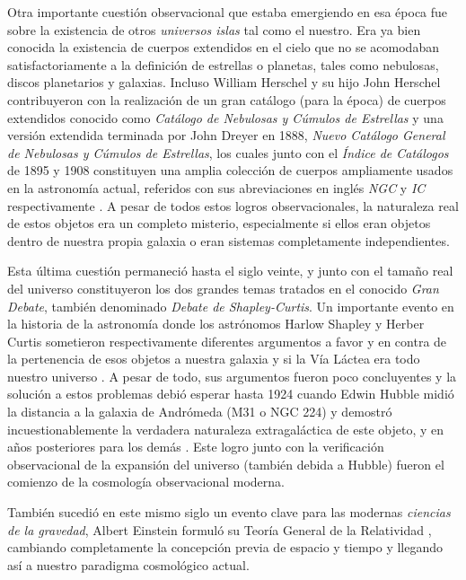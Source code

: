 Otra importante cuestión observacional que estaba emergiendo en esa época
fue sobre la existencia de otros \textit{universos islas} tal como el nuestro.
Era ya bien conocida la existencia de cuerpos extendidos en el cielo que no
se acomodaban satisfactoriamente a la definición de estrellas o planetas,
tales como nebulosas, discos planetarios y galaxias. Incluso William Herschel
y su hijo John Herschel contribuyeron con la realización de un gran catálogo
(para la época) de cuerpos extendidos conocido como \textit{Catálogo de 
Nebulosas y Cúmulos de Estrellas} y una versión extendida terminada por
John Dreyer en 1888, \textit{Nuevo Catálogo General de Nebulosas y Cúmulos
de Estrellas}, los cuales junto con el \textit{Índice de Catálogos} de 
1895 y 1908 constituyen una amplia colección de cuerpos ampliamente usados
en la astronomía actual, referidos con sus abreviaciones en inglés \textit{NGC}
y \textit{IC} respectivamente \cite{longair2008}. A pesar de todos estos
logros observacionales, la naturaleza real de estos objetos era un completo 
misterio, especialmente si ellos eran objetos dentro de nuestra propia 
galaxia o eran sistemas completamente independientes.


Esta última cuestión permaneció hasta el siglo veinte, y junto con el tamaño
real del universo constituyeron los dos grandes temas tratados en el 
conocido \textit{Gran Debate}, también denominado \textit{Debate de 
Shapley-Curtis}. Un importante evento en la historia de la astronomía donde
los astrónomos Harlow Shapley y Herber Curtis sometieron respectivamente 
diferentes argumentos a favor y en contra de la pertenencia de esos objetos
a nuestra galaxia y si la Vía Láctea era todo nuestro universo 
\cite{Curtis1921} \cite{Shapley1921}. A pesar de todo, sus argumentos fueron 
poco concluyentes y la solución a estos problemas debió esperar hasta 1924 
cuando Edwin Hubble midió la distancia a la galaxia de Andrómeda (M31 o 
NGC 224) y demostró incuestionablemente la verdadera naturaleza extragaláctica 
de este objeto, y en años posteriores para los demás \cite{Hubble1926}. 
Este logro junto con la verificación observacional de la expansión del 
universo (también debida a Hubble) fueron el comienzo de la cosmología 
observacional moderna.


También sucedió en este mismo siglo un evento clave para las modernas 
\textit{ciencias de la gravedad}, Albert Einstein formuló su Teoría
General de la Relatividad \cite{Einstein1916}, cambiando completamente 
la concepción previa de espacio y tiempo y llegando así a nuestro paradigma 
cosmológico actual.


